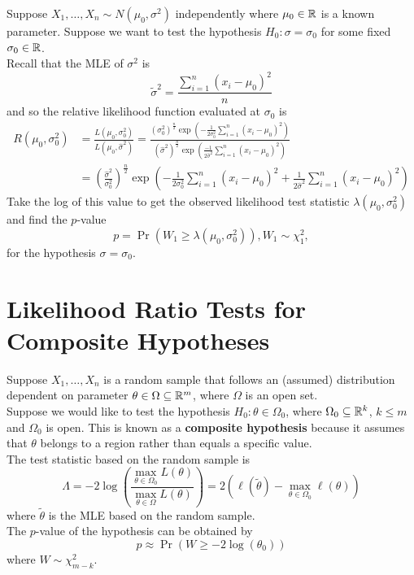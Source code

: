\documentclass[11pt,fleqn]{book} %
\begin{document}
\begin{example} \label{eg:726}
Suppose \(X_1, \ldots, X_n \sim N(\mu_0, \sigma^2)\) independently where \(\mu_0 \in \mathbb{R}\) is a known parameter. Suppose we want to test the hypothesis \(H_0: \sigma = \sigma_0\) for some fixed \(\sigma_0 \in \mathbb{R}\). \\
\indent Recall that the MLE of \(\sigma^2\) is
\[
\tilde{\sigma}^2 = \frac{\sum_{i=1}^n(x_i - \mu_0)^2}{n}
\]
and so the relative likelihood function evaluated at \(\sigma_0\) is
\[
\begin{aligned}
R(\mu_0, \sigma_0^2) &= \frac{L(\mu_0, \sigma_0^2)}{L(\mu_0, \hat{\sigma}^2)} = \frac{(\sigma_0^2)^{\frac{n}{2}}\exp\left(-\frac{1}{2\sigma_0^2}\sum_{i=1}^n(x_i - \mu_0)^2\right)}{(\hat{\sigma}^2)^{\frac{n}{2}}\exp\left(\frac{-1}{2\hat{\sigma}^2}\sum_{i=1}^n(x_i - \mu_0)^2\right)} \\
&= \left(\frac{\hat{\sigma}^2}{\sigma_0^2}\right)^{\frac{n}{2}}\exp\left(-\frac{1}{2\sigma_0^2}\sum_{i=1}^n(x_i - \mu_0)^2 + \frac{1}{2\hat{\sigma}^2}\sum_{i=1}^n(x_i - \mu_0)^2\right)
\end{aligned}
\]
\indent Take the log of this value to get the observed likelihood test statistic \(\lambda(\mu_0, \sigma_0^2)\) and find the \(p\)-value
\[
p = \Pr(W_1 \geq \lambda(\mu_0, \sigma_0^2)), W_1 \sim \chi^2_1,
\]
for the hypothesis \(\sigma = \sigma_0\).
\end{example}


\section{Likelihood Ratio Tests for Composite Hypotheses}

\begin{remark} \label{rmk:731}
Suppose \(X_1, \ldots, X_n\) is a random sample that follows an (assumed) distribution dependent on parameter \(\theta \in \Omega \subseteq \mathbb{R}^m\), where \(\Omega\) is an open set. \\
\indent Suppose we would like to test the hypothesis \(H_0: \theta \in \Omega_0\), where \(\Omega_0 \subseteq \mathbb{R}^k\), \(k \leq m\) and \(\Omega_0\) is open. This is known as a \textbf{composite hypothesis} because it assumes that \(\theta\) belongs to a region rather than equals a specific value. \\
\indent The test statistic based on the random sample is
\[
\Lambda = -2\log\left(\frac{\max_{\theta \in \Omega_0} L(\theta)}{\max_{\theta \in \Omega}L(\theta)}\right) = 2(\ell(\tilde{\theta}) - \max_{\theta \in \Omega_0}\ell(\theta))
\]
where \(\tilde{\theta}\) is the MLE based on the random sample. \\
\indent The \(p\)-value of the hypothesis can be obtained by
\[
p \approx \Pr(W \geq -2\log(\theta_0))
\]
where \(W \sim \chi^2_{m-k}\).
\end{remark}
\end{document}
